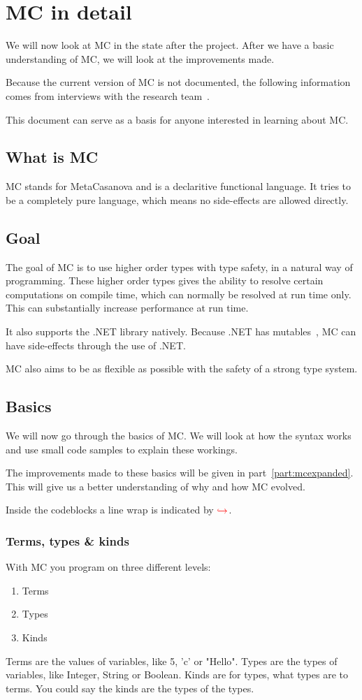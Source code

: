 \chapter{MC in detail}
We will now look at MC in the state after the project.
After we have a basic understanding of MC, we will look at the improvements made.

Because the current version of MC is not documented, the following information comes from interviews with the research team~\cite{researchteaminterview}.

This document can serve as a basis for anyone interested in learning about MC.


\section{What is MC}
MC stands for MetaCasanova and is a declaritive functional language.
It tries to be a completely pure language, which means no side-effects are allowed directly.


\section{Goal}
The goal of MC is to use higher order types with type safety, in a natural way of programming.
These higher order types gives the ability to resolve certain computations on compile time, which can normally be resolved at run time only.
This can substantially increase performance at run time.

It also supports the .NET library natively.
Because .NET has mutables~\cite{dotnetdescription}, MC can have side-effects through the use of .NET.

MC also aims to be as flexible as possible with the safety of a strong type system.


\section{Basics}
We will now go through the basics of MC.
We will look at how the syntax works and use small code samples to explain these workings.

The improvements made to these basics will be given in part~\ref{part:mcexpanded}.
This will give us a better understanding of why and how MC evolved.

Inside the codeblocks a line wrap is indicated by \ensuremath{\color{red}\hookrightarrow\space}.


\subsection{Terms, types \& kinds}\label{sec:basiclevels}
With MC you program on three different levels:
\begin{enumerate}[noitemsep]
   \item Terms
   \item Types
   \item Kinds
\end{enumerate}
Terms are the values of variables, like 5, 'c' or "Hello".
Types are the types of variables, like Integer, String or Boolean.
Kinds are for types, what types are to terms.
You could say the kinds are the types of the types.


